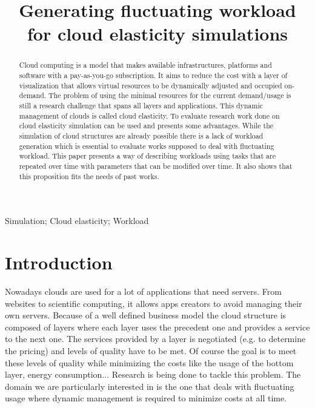 \documentclass[a4paper]{IEEEtran}
\title{Generating fluctuating workload for cloud elasticity simulations}
\author{
	\IEEEauthorblockN{Simon Bihel}
	\IEEEauthorblockA{(Student) Computer Science Department, ENS Rennes\\
	\href{mailto:simon.bihel@ens-rennes.fr}{simon.bihel@ens-rennes.fr}}
}
\begin{document}
\maketitle

\begin{abstract}
  Cloud computing is a model that makes available infrastructures, platforms and
  software with a pay-as-you-go subscription. It aims to reduce the cost with a
  layer of visualization that allows virtual resources to be dynamically
  adjusted and occupied on-demand. The problem of using the minimal resources
  for the current demand/usage is still a research challenge that spans all
  layers and applications. This dynamic management of clouds is called cloud
  elasticity. To evaluate research work done on cloud elasticity simulation can 
  be used and presents some advantages. While the simulation of cloud 
  structures are already possible there is a lack of workload generation which 
  is essential to evaluate works supposed to deal with fluctuating workload. 
  This paper presents a way of describing workloads using tasks that are 
  repeated over time with parameters that can be modified over time. It also 
  shows that this proposition fits the needs of past works.
\end{abstract}

\begin{IEEEkeywords}
  Simulation;
  Cloud elasticity;
  Workload
\end{IEEEkeywords}

\section{Introduction} \label{intro}
  Nowadays clouds are used for a lot of applications that need servers. From 
  websites to scientific computing, it allows apps creators to avoid managing 
  their own servers. Because of a well defined business model the cloud 
  structure is composed of layers where each layer uses the precedent one and 
  provides a service to the next one. The services provided by a layer is 
  negotiated (e.g. to determine the pricing) and levels of quality have to be 
  met. Of course the goal is to meet these levels of quality while minimizing 
  the costs like the usage of the bottom layer, energy consumption... Research 
  is being done to tackle this problem. The domain we are particularly 
  interested in is the one that deals with fluctuating usage where dynamic 
  management is required to minimize costs at all time.
  
\end{document}

